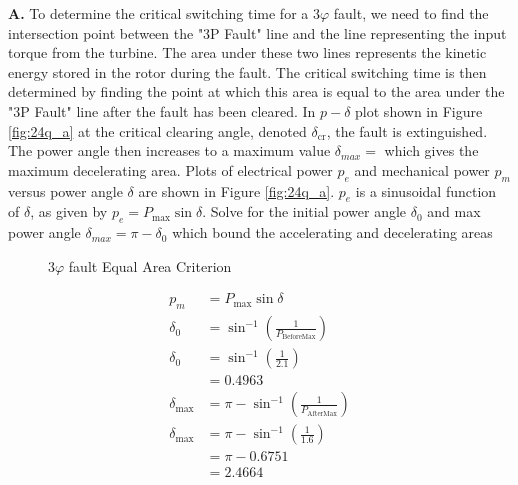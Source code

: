 \documentclass[main.tex]{subfiles}
\begin{document}
\begin{enumerate}
\textbf{A.} To determine the critical switching time for a $3 \varphi$ fault, we need to find the intersection point between the "3P Fault" line and the line representing the input torque from the turbine. The area under these two lines represents the kinetic energy stored in the rotor during the fault. The critical switching time is then determined by finding the point at which this area is equal to the area under the "3P Fault" line after the fault has been cleared. In $p-\delta$ plot shown in Figure \ref{fig:24q_a} at the critical clearing angle, denoted $\delta_{\mathrm{cr}}$, the fault is extinguished. The power angle then increases to a maximum value $\delta_{max} =$ which gives the maximum decelerating area. Plots of electrical power $p_e$ and mechanical power $p_m$ versus power angle $\delta$ are shown in Figure \ref{fig:24q_a}. $p_e$ is a sinusoidal function of $\delta$, as given by $p_e = P_{\max } \sin \delta$. Solve for the initial power angle $\delta_0$ and max power angle $\delta_{max} = \pi-\delta_0$ which bound the accelerating and decelerating areas

\begin{figure}
\centering{}
\caption{$3 \varphi$ fault Equal Area Criterion}
\label{fig:24a_a}
\end{figure}

$$
\begin{aligned}
p_m &= P_{\max} \sin \delta\\
\delta_0 &= \sin^{-1}\left(\frac{1}{P_{\text{BeforeMax}}}\right)\\
\delta_0 &= \sin^{-1}\left(\frac{1}{2.1}\right)\\
&= 0.4963\\
\delta_{\max} &= \pi - \sin^{-1}\left(\frac{1}{P_{\text{AfterMax}}}\right)\\
\delta_{\max} &= \pi - \sin^{-1}\left(\frac{1}{1.6}\right)\\
&= \pi - 0.6751\\
&= 2.4664
\end{aligned}
$$


\end{enumerate}
\end{document}
